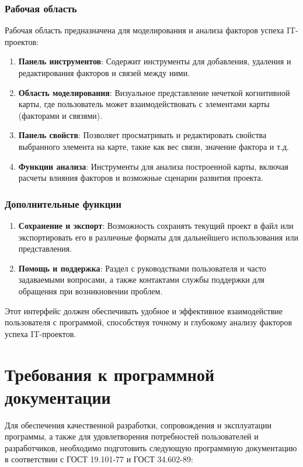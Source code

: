 \documentclass{article}
\begin{document}
    \subsubsection{Рабочая область}
    Рабочая область предназначена для моделирования и анализа факторов успеха IT-проектов:
    \begin{enumerate}
        \item \textbf{Панель инструментов}: Содержит инструменты для добавления, удаления и редактирования факторов и связей между ними.
        \item \textbf{Область моделирования}: Визуальное представление нечеткой когнитивной карты, где пользователь может взаимодействовать с элементами карты (факторами и связями).
        \item \textbf{Панель свойств}: Позволяет просматривать и редактировать свойства выбранного элемента на карте, такие как вес связи, значение фактора и т.д.
        \item \textbf{Функции анализа}: Инструменты для анализа построенной карты, включая расчеты влияния факторов и возможные сценарии развития проекта.
    \end{enumerate}

    \subsubsection{Дополнительные функции}
    \begin{enumerate}
        \item \textbf{Сохранение и экспорт}: Возможность сохранять текущий проект в файл или экспортировать его в различные форматы для дальнейшего использования или представления.
        \item \textbf{Помощь и поддержка}: Раздел с руководствами пользователя и часто задаваемыми вопросами, а также контактами службы поддержки для обращения при возникновении проблем.
    \end{enumerate}
    Этот интерфейс должен обеспечивать удобное и эффективное взаимодействие пользователя с программой, способствуя точному и глубокому анализу факторов успеха IT-проектов.
    \newpage
    \section {Требования к программной документации}
    Для обеспечения качественной разработки, сопровождения и эксплуатации программы, а также для удовлетворения потребностей пользователей и разработчиков, необходимо подготовить следующую программную документацию в соответствии с ГОСТ 19.101-77 и ГОСТ 34.602-89:
\end{document}
